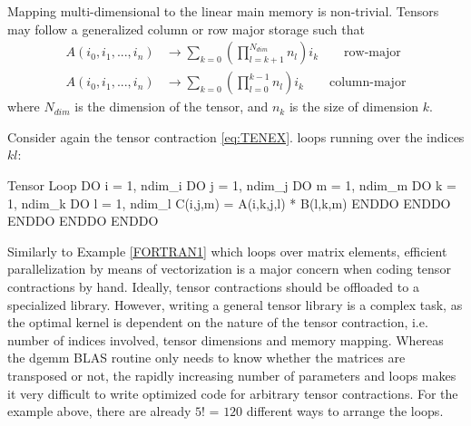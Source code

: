 Mapping multi-dimensional to the linear main memory is non-trivial. Tensors may follow a generalized column or row major storage such that
\begin{align}
A(i_0,i_1,...,i_n) &\rightarrow \sum_{k=0} \left( \prod_{l=k+1}^{N_{dim}} n_l \right) i_k \qquad \textrm{row-major} \\
A(i_0,i_1,...,i_n) &\rightarrow \sum_{k=0} \left( \prod_{l=0}^{k-1} n_l \right) i_k \qquad \textrm{column-major} 
\end{align} 
\noindent where $N_{dim}$ is the dimension of the tensor, and $n_k$ is the size of dimension $k$.

Consider again the tensor contraction \ref{eq:TENEX}.  loops running over the indices $kl$:
\begin{fortran}{Tensor Loop \label{lst:TLOOP}}
DO i = 1, ndim_i
  DO j = 1, ndim_j
    DO m = 1, ndim_m
      DO k = 1, ndim_k
        DO l = 1, ndim_l
          C(i,j,m) = A(i,k,j,l) * B(l,k,m)
        ENDDO
      ENDDO
    ENDDO
  ENDDO
ENDDO
\end{fortran}
\noindent Similarly to Example \ref{FORTRAN1} which loops over matrix elements, efficient parallelization by means of vectorization is a major concern when coding tensor contractions by hand. Ideally, tensor contractions should be offloaded to a specialized library. However, writing a general tensor library is a complex task, as the optimal kernel is dependent on the nature of the tensor contraction, i.e. number of indices involved, tensor dimensions and memory mapping. Whereas the \textrm{dgemm} BLAS routine only needs to know whether the matrices are transposed or not, the rapidly increasing number of parameters and loops makes it very difficult to write optimized code for arbitrary tensor contractions. For the example above, there are already $5!$ = $120$ different ways to arrange the loops.  


